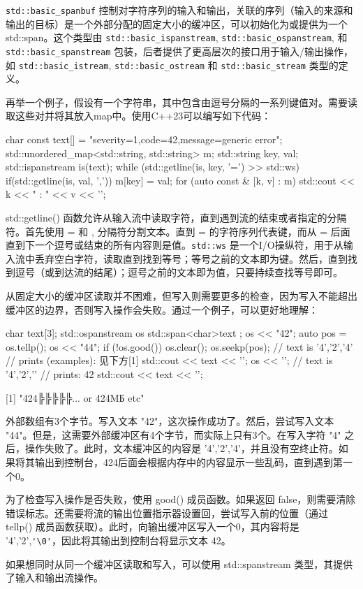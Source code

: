 \verb|std::basic_spanbuf| 控制对字符序列的输入和输出，关联的序列（输入的来源和输出的目标）是一个外部分配的固定大小的缓冲区，可以初始化为或提供为一个 std::span。这个类型由 \verb|std::basic_ispanstream|, \verb|std::basic_ospanstream|, 和 \verb|std::basic_spanstream| 包装，后者提供了更高层次的接口用于输入/输出操作，如 \verb|std::basic_istream|, \verb|std::basic_ostream| 和 \verb|std::basic_stream| 类型的定义。

再举一个例子，假设有一个字符串，其中包含由逗号分隔的一系列键值对。需要读取这些对并将其放入map中。使用C++23可以编写如下代码：

\begin{cpp}
char const text[] = "severity=1,code=42,message=generic error";
std::unordered_map<std::string, std::string> m;
std::string key, val;
std::ispanstream is(text);
while (std::getline(is, key, '=') >> std::ws)
{
    if(std::getline(is, val, ','))
        m[key] = val;
}
for (auto const & [k, v] : m)
{
    std::cout << k << " : " << v << '\n';
}
\end{cpp}

std::getline() 函数允许从输入流中读取字符，直到遇到流的结束或者指定的分隔符。首先使用 = 和 , 分隔符分割文本。直到 = 的字符序列代表键，而从 = 后面直到下一个逗号或结束的所有内容则是值。\verb|std::ws| 是一个I/O操纵符，用于从输入流中丢弃空白字符，读取直到找到等号；等号之前的文本即为键。然后，直到找到逗号（或到达流的结尾）；逗号之前的文本即为值，只要持续查找等号即可。

从固定大小的缓冲区读取并不困难，但写入则需要更多的检查，因为写入不能超出缓冲区的边界，否则写入操作会失败。通过一个例子，可以更好地理解：

\begin{cpp}
char text[3]{};
std::ospanstream os{ std::span<char>{text} };
os << "42";
auto pos = os.tellp();
os << "44";
if (!os.good())
{
    os.clear();
    os.seekp(pos);
}
// text is {'4','2','4'}
// prints (examples): 见下方[1]
std::cout << text << '\n';
os << '\0';
// text is {'4','2','\0'}
// prints: 42
std::cout << text << '\n';
\end{cpp}

{
\tiny
[1] "424╠╠╠╠╠... or 424MƂ etc"
}

外部数组有3个字节。写入文本 "42"，这次操作成功了。然后，尝试写入文本 "44"。但是，这需要外部缓冲区有4个字节，而实际上只有3个。在写入字符 "4" 之后，操作失败了。此时，文本缓冲区的内容是 '4','2','4'，并且没有空终止符。如果将其输出到控制台，424后面会根据内存中的内容显示一些乱码，直到遇到第一个0。

为了检查写入操作是否失败，使用 good() 成员函数。如果返回 false，则需要清除错误标志。还需要将流的输出位置指示器设置回，尝试写入前的位置（通过 tellp() 成员函数获取）。此时，向输出缓冲区写入一个0，其内容将是 '4','2',\verb|'\0'|，因此将其输出到控制台将显示文本 42。

如果想同时从同一个缓冲区读取和写入，可以使用 std::spanstream 类型，其提供了输入和输出流操作。












